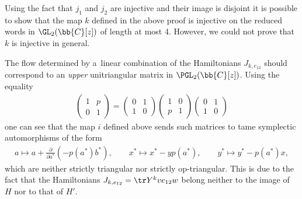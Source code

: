\begin{remark}
Using the fact that \(j_{1}\) and \(j_{2}\) are injective and their image is disjoint it is possible to
show that the map \(k\) def\/ined in the above proof is injective on the reduced words in
\(\GL_{2}(\bb{C}[z])\) of length at most 4.
However, we could not prove that \(k\) is injective in general.
\end{remark}
\begin{remark}
\label{rem:ot-h}
The f\/low determined by a~linear combination of the Hamiltonians \(J_{k,e_{12}}\) should correspond to an
\emph{upper} unitriangular matrix in \(\PGL_{2}(\bb{C}[z])\).
Using the equality
\begin{gather*}
\begin{pmatrix}
1&p
\\
0&1
\end{pmatrix}
=
\begin{pmatrix}
0&1
\\
1&0
\end{pmatrix}
\begin{pmatrix}
1&0
\\
p&1
\end{pmatrix}
\begin{pmatrix}
0&1
\\
1&0
\end{pmatrix}
\end{gather*}
one can see that the map \(i\) def\/ined above sends such matrices to tame symplectic automorphisms of the
form
\begin{gather*}
a\mapsto a+\frac{\partial}{\partial a^{*}}(-p(a^{*})b^{*}),
\qquad
x^{*}\mapsto x^{*}-yp(a^{*}),
\qquad
y^{*}\mapsto y^{*}-p(a^{*})x,
\end{gather*}
which are neither strictly triangular nor strictly op-triangular.
This is due to the fact that the Hamiltonians \(J_{k,e_{12}} = \tr Y^{k}ve_{12}w\) belong neither to the
image of \(H\) nor to that of \(H'\).
\end{remark}
